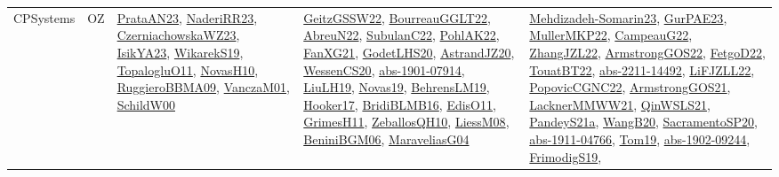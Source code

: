 {\begin{longtable}{lp{3cm}>{\raggedright}p{6cm}>{\raggedright}p{6cm}p{8cm}}
CPSystems & OZ & \href{articles/PrataAN23.pdf}{PrataAN23}\cite{PrataAN23}, \href{articles/NaderiRR23.pdf}{NaderiRR23}\cite{NaderiRR23}, \href{articles/CzerniachowskaWZ23.pdf}{CzerniachowskaWZ23}\cite{CzerniachowskaWZ23}, \href{articles/IsikYA23.pdf}{IsikYA23}\cite{IsikYA23}, \href{articles/WikarekS19.pdf}{WikarekS19}\cite{WikarekS19}, \href{articles/TopalogluO11.pdf}{TopalogluO11}\cite{TopalogluO11}, \href{articles/NovasH10.pdf}{NovasH10}\cite{NovasH10}, \href{articles/RuggieroBBMA09.pdf}{RuggieroBBMA09}\cite{RuggieroBBMA09}, \href{papers/VanczaM01.pdf}{VanczaM01}\cite{VanczaM01}, \href{articles/SchildW00.pdf}{SchildW00}\cite{SchildW00} & \href{papers/GeitzGSSW22.pdf}{GeitzGSSW22}\cite{GeitzGSSW22}, \href{articles/BourreauGGLT22.pdf}{BourreauGGLT22}\cite{BourreauGGLT22}, \href{articles/AbreuN22.pdf}{AbreuN22}\cite{AbreuN22}, \href{articles/SubulanC22.pdf}{SubulanC22}\cite{SubulanC22}, \href{articles/PohlAK22.pdf}{PohlAK22}\cite{PohlAK22}, \href{articles/FanXG21.pdf}{FanXG21}\cite{FanXG21}, \href{papers/GodetLHS20.pdf}{GodetLHS20}\cite{GodetLHS20}, \href{articles/AstrandJZ20.pdf}{AstrandJZ20}\cite{AstrandJZ20}, \href{papers/WessenCS20.pdf}{WessenCS20}\cite{WessenCS20}, \href{articles/abs-1901-07914.pdf}{abs-1901-07914}\cite{abs-1901-07914}, \href{papers/LiuLH19.pdf}{LiuLH19}\cite{LiuLH19}, \href{articles/Novas19.pdf}{Novas19}\cite{Novas19}, \href{papers/BehrensLM19.pdf}{BehrensLM19}\cite{BehrensLM19}, \href{papers/Hooker17.pdf}{Hooker17}\cite{Hooker17}, \href{articles/BridiBLMB16.pdf}{BridiBLMB16}\cite{BridiBLMB16}, \href{papers/EdisO11.pdf}{EdisO11}\cite{EdisO11}, \href{papers/GrimesH11.pdf}{GrimesH11}\cite{GrimesH11}, \href{articles/ZeballosQH10.pdf}{ZeballosQH10}\cite{ZeballosQH10}, \href{articles/LiessM08.pdf}{LiessM08}\cite{LiessM08}, \href{papers/BeniniBGM06.pdf}{BeniniBGM06}\cite{BeniniBGM06}, \href{papers/MaraveliasG04.pdf}{MaraveliasG04}\cite{MaraveliasG04} & \href{papers/Mehdizadeh-Somarin23.pdf}{Mehdizadeh-Somarin23}\cite{Mehdizadeh-Somarin23}, \href{articles/GurPAE23.pdf}{GurPAE23}\cite{GurPAE23}, \href{articles/MullerMKP22.pdf}{MullerMKP22}\cite{MullerMKP22}, \href{articles/CampeauG22.pdf}{CampeauG22}\cite{CampeauG22}, \href{papers/ZhangJZL22.pdf}{ZhangJZL22}\cite{ZhangJZL22}, \href{papers/ArmstrongGOS22.pdf}{ArmstrongGOS22}\cite{ArmstrongGOS22}, \href{articles/FetgoD22.pdf}{FetgoD22}\cite{FetgoD22}, \href{papers/TouatBT22.pdf}{TouatBT22}\cite{TouatBT22}, \href{articles/abs-2211-14492.pdf}{abs-2211-14492}\cite{abs-2211-14492}, \href{papers/LiFJZLL22.pdf}{LiFJZLL22}\cite{LiFJZLL22}, \href{papers/PopovicCGNC22.pdf}{PopovicCGNC22}\cite{PopovicCGNC22}, \href{papers/ArmstrongGOS21.pdf}{ArmstrongGOS21}\cite{ArmstrongGOS21}, \href{papers/LacknerMMWW21.pdf}{LacknerMMWW21}\cite{LacknerMMWW21}, \href{articles/QinWSLS21.pdf}{QinWSLS21}\cite{QinWSLS21}, \href{articles/PandeyS21a.pdf}{PandeyS21a}\cite{PandeyS21a}, \href{papers/WangB20.pdf}{WangB20}\cite{WangB20}, \href{articles/SacramentoSP20.pdf}{SacramentoSP20}\cite{SacramentoSP20}, \href{articles/abs-1911-04766.pdf}{abs-1911-04766}\cite{abs-1911-04766}, \href{papers/Tom19.pdf}{Tom19}\cite{Tom19}, \href{articles/abs-1902-09244.pdf}{abs-1902-09244}\cite{abs-1902-09244}, \href{papers/FrimodigS19.pdf}{FrimodigS19}\cite{FrimodigS19}, 
\end{longtable}}

